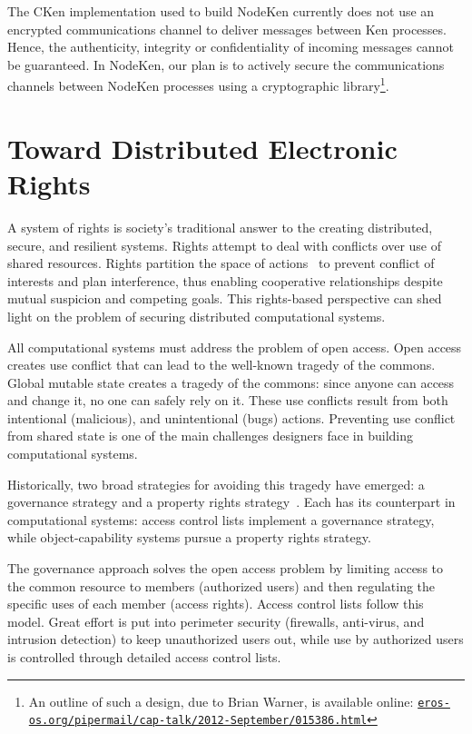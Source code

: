 \documentclass{llncs}
\newcommand{\myurl}[1]{{\href{http://#1}{\texttt{#1}}}}
\begin{document}
The CKen implementation used to build NodeKen currently does not use an encrypted communications channel to deliver messages between Ken processes. Hence, the authenticity, integrity or confidentiality of incoming messages cannot be guaranteed. In NodeKen, our plan is to actively secure the communications channels between NodeKen processes using a cryptographic library\footnote{
%
An outline of such a design, due to Brian Warner, is available online: \myurl{eros-os.org/pipermail/cap-talk/2012-September/015386.html}}.

\section{Toward Distributed Electronic Rights}
\label{towardErights}

A system of rights is society's traditional answer to the creating distributed, secure, and resilient systems. Rights attempt to deal with conflicts over use of shared resources. Rights partition the space of actions~\cite{steiner1994essay} to prevent conflict of interests and plan interference, thus enabling cooperative relationships despite mutual suspicion and competing goals. This rights-based perspective can shed light on the problem of securing distributed computational systems.

All computational systems must address the problem of open access. Open access creates use conflict that can lead to the well-known tragedy of the commons. Global mutable state creates a tragedy of the commons: since anyone can access and change it, no one can safely rely on it. These use conflicts result from both intentional (malicious), and unintentional (bugs) actions. Preventing use conflict from shared state is one of the main challenges designers face in building computational systems.

Historically, two broad strategies for avoiding this tragedy have emerged: a governance strategy and a property rights strategy~\cite{smith2002exclusion}. Each has its counterpart in computational systems: access control lists implement a governance strategy, while object-capability systems pursue a property rights strategy.

The governance approach solves the open access problem by limiting access to the common resource to members (authorized users) and then regulating the specific uses of each member (access rights). Access control lists follow this model. Great effort is put into perimeter security (firewalls, anti-virus, and intrusion detection) to keep unauthorized users out, while use by authorized users is controlled through detailed access control lists.
\end{document}
